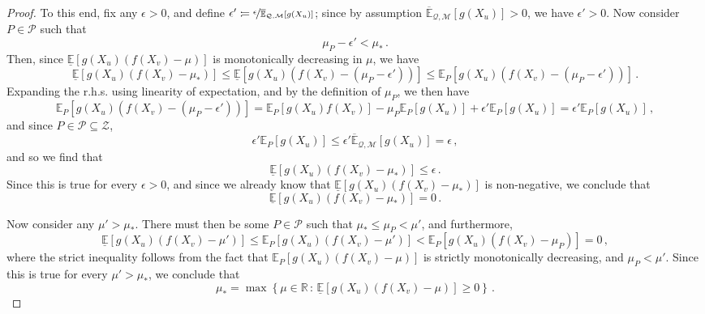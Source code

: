 \documentclass[twoside,11pt]{article}
\newcommand{\reals}{\mathbb{R}}
\newcommand{\uexp}{\overline{\mathbb{E}}_{\rateset,\mathcal{M}}}
\newcommand{\rateset}{\mathcal{Q}}
\newcommand{\coloneqq}{:\!=}
\begin{document}
\begin{proof}
To this end, fix any $\epsilon>0$, and define $\epsilon'\coloneqq \nicefrac{\epsilon}{\uexp[g(X_u)]}$; since by assumption $\uexp[g(X_u)]>0$, we have $\epsilon' >0$. Now consider $P\in\mathcal{P}$ such that
\begin{equation*}
\mu_P - \epsilon' < \mu_*\,.
\end{equation*}
Then, since $\underline{\mathbb{E}}[g(X_u)(f(X_v) - \mu)]$ is monotonically decreasing in $\mu$, we have
\begin{equation*}
\underline{\mathbb{E}}[g(X_u)(f(X_v) - \mu_*)] \leq \underline{\mathbb{E}}[g(X_u)(f(X_v) - (\mu_P - \epsilon'))]\leq \mathbb{E}_P[g(X_u)(f(X_v) - (\mu_P - \epsilon'))]\,.
\end{equation*}
Expanding the r.h.s. using linearity of expectation, and by the definition of $\mu_P$, we then have
\begin{equation*}
\mathbb{E}_P[g(X_u)(f(X_v) - (\mu_P - \epsilon'))] = \mathbb{E}_P[g(X_u)f(X_v)] - \mu_P\mathbb{E}_P[g(X_u)] + \epsilon'\mathbb{E}_P[g(X_u)] = \epsilon'\mathbb{E}_P[g(X_u)]\,,
\end{equation*}
and since $P\in\mathcal{P}\subseteq\mathcal{Z}$,
\begin{equation*}
\epsilon'\mathbb{E}_P[g(X_u)] \leq \epsilon'\uexp[g(X_u)]=\epsilon\,,
\end{equation*}
and so we find that
\begin{equation*}
\underline{\mathbb{E}}[g(X_u)(f(X_v) - \mu_*)] \leq \epsilon\,.
\end{equation*}
Since this is true for every $\epsilon>0$, and since we already know that $\underline{\mathbb{E}}[g(X_u)(f(X_v) - \mu_*)]$ is non-negative, we conclude that
\begin{equation*}
\underline{\mathbb{E}}[g(X_u)(f(X_v) - \mu_*)] = 0\,.
\end{equation*}

Now consider any $\mu' > \mu_*$. There must then be some $P\in\mathcal{P}$ such that $\mu_*\leq \mu_P < \mu'$, and furthermore,
\begin{equation*}
\underline{\mathbb{E}}[g(X_u)(f(X_v) - \mu')] \leq \mathbb{E}_P[g(X_u)(f(X_v) - \mu')] < \mathbb{E}_P[g(X_u)(f(X_v) - \mu_P)] = 0\,,
\end{equation*}
where the strict inequality follows from the fact that $\mathbb{E}_P[g(X_u)(f(X_v) - \mu)]$ is strictly monotonically decreasing, and $\mu_P<\mu'$. Since this is true for every $\mu'>\mu_*$, we conclude that
\begin{equation*}
\mu_* = \max\left\{ \mu\in\reals\,:\, \underline{\mathbb{E}}[g(X_u)(f(X_v) - \mu)] \geq 0 \right\}\,.
\end{equation*}


\end{proof}
\end{document}
